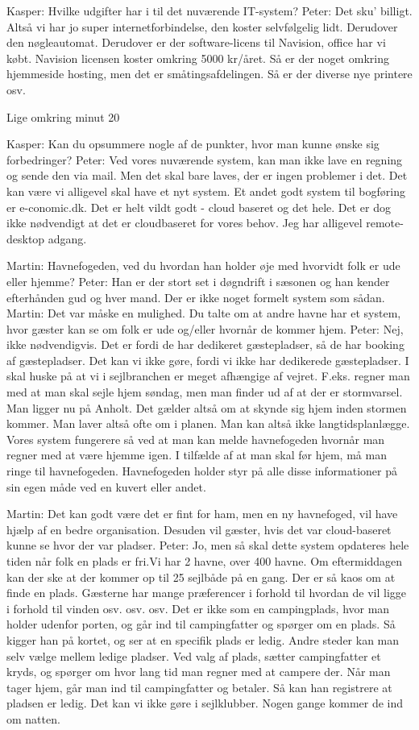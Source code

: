 \documentclass[a4paper]{article}
\begin{document}
Kasper: Hvilke udgifter har i til det nuværende IT-system?
Peter: Det sku' billigt. Altså vi har jo super internetforbindelse, den koster selvfølgelig lidt. Derudover den nøgleautomat. Derudover er der software-licens til Navision, office har vi købt. Navision licensen koster omkring 5000 kr/året. Så er der noget omkring hjemmeside hosting, men det er småtingsafdelingen. Så er der diverse nye printere osv.

Lige omkring minut 20

Kasper: Kan du opsummere nogle af de punkter, hvor man kunne ønske sig forbedringer?
Peter: Ved vores nuværende system, kan man ikke lave en regning og sende den via mail. Men det skal bare laves, der er ingen problemer i det. Det kan være vi alligevel skal have et nyt system. Et andet godt system til bogføring er e-conomic.dk. Det er helt vildt godt - cloud baseret og det hele. Det er dog ikke nødvendigt at det er cloudbaseret for vores behov. Jeg har alligevel remote-desktop adgang.

Martin: Havnefogeden, ved du hvordan han holder øje med hvorvidt folk er ude eller hjemme?
Peter: Han er der stort set i døgndrift i sæsonen og han kender efterhånden gud og hver mand. Der er ikke noget formelt system som sådan.
Martin: Det var måske en mulighed. Du talte om at andre havne har et system, hvor gæster kan se om folk er ude og/eller hvornår de kommer hjem.
Peter: Nej, ikke nødvendigvis. Det er fordi de har dedikeret gæstepladser, så de har booking af gæstepladser. Det kan vi ikke gøre, fordi vi ikke har dedikerede gæstepladser. I skal huske på at vi i sejlbranchen er meget afhængige af vejret. F.eks. regner man med at man skal sejle hjem søndag, men man finder ud af at der er stormvarsel. Man ligger nu på Anholt. Det gælder altså om at skynde sig hjem inden stormen kommer. Man laver altså ofte om i planen. Man kan altså ikke langtidsplanlægge. Vores system fungerere så ved at man kan melde havnefogeden hvornår man regner med at være hjemme igen. I tilfælde af at man skal før hjem, må man ringe til havnefogeden. Havnefogeden holder styr på alle disse informationer på sin egen måde ved en kuvert eller andet.

Martin: Det kan godt være det er fint for ham, men en ny havnefoged, vil have hjælp af en bedre organisation. Desuden vil gæster, hvis det var cloud-baseret kunne se hvor der var pladser.
Peter: Jo, men så skal dette system opdateres hele tiden når folk en plads er fri.Vi har 2 havne, over 400 havne. Om eftermiddagen kan der ske at der kommer op til 25 sejlbåde på en gang. Der er så kaos om at finde en plads. Gæsterne har mange præferencer i forhold til hvordan de vil ligge i forhold til vinden osv. osv. osv. Det er ikke som en campingplads, hvor man holder udenfor porten, og går ind til campingfatter og spørger om en plads. Så kigger han på kortet, og ser at en specifik plads er ledig. Andre steder kan man selv vælge mellem ledige pladser. Ved valg af plads, sætter campingfatter et kryds, og spørger om hvor lang tid man regner med at campere der. Når man tager hjem, går man ind til campingfatter og betaler. Så kan han registrere at pladsen er ledig. Det kan vi ikke gøre i sejlklubber. Nogen gange kommer de ind om natten.
\end{document}
